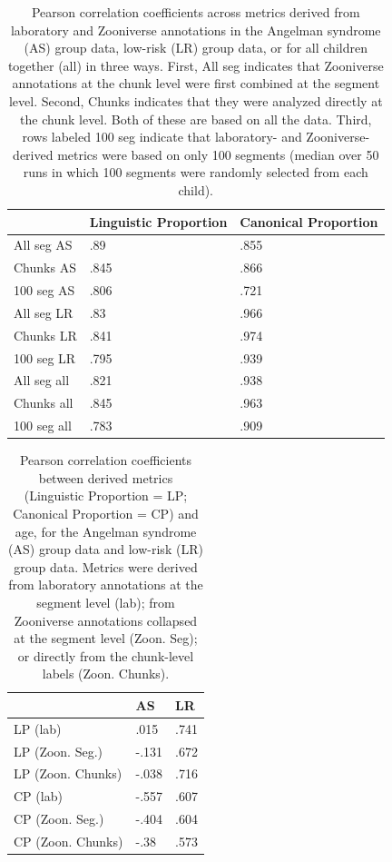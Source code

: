 \documentclass[
  english,
  ,man]{apa6}
\begin{document}
\begin{table}

\caption{\label{tab:tab-cors}Pearson correlation coefficients across metrics derived from laboratory and Zooniverse annotations in the Angelman syndrome (AS) group data, low-risk (LR) group data, or for all children together (all) in three ways. First, All seg indicates that Zooniverse annotations at the chunk level were first combined at the segment level. Second, Chunks indicates that they were analyzed directly at the chunk level. Both of these are based on all the data. Third, rows labeled 100 seg indicate that laboratory- and Zooniverse-derived metrics were based on only 100 segments (median over 50 runs in which 100 segments were randomly selected from each child).}
\centering
\begin{tabular}[t]{l|l|l}
\hline
  & Linguistic Proportion & Canonical Proportion\\
\hline
All seg AS & .89 & .855\\
\hline
Chunks AS & .845 & .866\\
\hline
100 seg AS & .806 & .721\\
\hline
All seg LR & .83 & .966\\
\hline
Chunks LR & .841 & .974\\
\hline
100 seg LR & .795 & .939\\
\hline
All seg all & .821 & .938\\
\hline
Chunks all & .845 & .963\\
\hline
100 seg all & .783 & .909\\
\hline
\end{tabular}
\end{table}

\begin{table}

\caption{\label{tab:tab-corage}Pearson correlation coefficients between derived metrics (Linguistic Proportion = LP; Canonical Proportion = CP) and age, for the Angelman syndrome (AS) group data and low-risk (LR) group data. Metrics were derived from laboratory annotations at the segment level (lab); from Zooniverse annotations collapsed at the segment level (Zoon. Seg); or directly from the chunk-level labels (Zoon. Chunks). }
\centering
\begin{tabular}[t]{l|l|l}
\hline
  & AS & LR\\
\hline
LP (lab) & .015 & .741\\
\hline
LP (Zoon. Seg.) & -.131 & .672\\
\hline
LP (Zoon. Chunks) & -.038 & .716\\
\hline
CP (lab) & -.557 & .607\\
\hline
CP (Zoon. Seg.) & -.404 & .604\\
\hline
CP (Zoon. Chunks) & -.38 & .573\\
\hline
\end{tabular}
\end{table}
\end{document}
